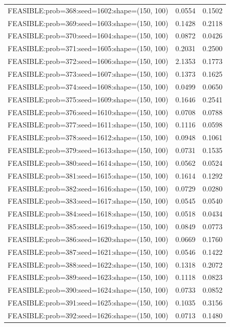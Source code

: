 \begin{longtable}{lcc}
FEASIBLE:prob=368:seed=1602:shape=(150, 100) &   0.0554 & 0.1502 \\
FEASIBLE:prob=369:seed=1603:shape=(150, 100) &   0.1428 & 0.2118 \\
FEASIBLE:prob=370:seed=1604:shape=(150, 100) &   0.0872 & 0.0426 \\
FEASIBLE:prob=371:seed=1605:shape=(150, 100) &   0.2031 & 0.2500 \\
FEASIBLE:prob=372:seed=1606:shape=(150, 100) &   2.1353 & 0.1773 \\
FEASIBLE:prob=373:seed=1607:shape=(150, 100) &   0.1373 & 0.1625 \\
FEASIBLE:prob=374:seed=1608:shape=(150, 100) &   0.0499 & 0.0650 \\
FEASIBLE:prob=375:seed=1609:shape=(150, 100) &   0.1646 & 0.2541 \\
FEASIBLE:prob=376:seed=1610:shape=(150, 100) &   0.0708 & 0.0788 \\
FEASIBLE:prob=377:seed=1611:shape=(150, 100) &   0.1116 & 0.0598 \\
FEASIBLE:prob=378:seed=1612:shape=(150, 100) &   0.0948 & 0.1061 \\
FEASIBLE:prob=379:seed=1613:shape=(150, 100) &   0.0731 & 0.1535 \\
FEASIBLE:prob=380:seed=1614:shape=(150, 100) &   0.0562 & 0.0524 \\
FEASIBLE:prob=381:seed=1615:shape=(150, 100) &   0.1614 & 0.1292 \\
FEASIBLE:prob=382:seed=1616:shape=(150, 100) &   0.0729 & 0.0280 \\
FEASIBLE:prob=383:seed=1617:shape=(150, 100) &   0.0545 & 0.0540 \\
FEASIBLE:prob=384:seed=1618:shape=(150, 100) &   0.0518 & 0.0434 \\
FEASIBLE:prob=385:seed=1619:shape=(150, 100) &   0.0849 & 0.0773 \\
FEASIBLE:prob=386:seed=1620:shape=(150, 100) &   0.0669 & 0.1760 \\
FEASIBLE:prob=387:seed=1621:shape=(150, 100) &   0.0546 & 0.1422 \\
FEASIBLE:prob=388:seed=1622:shape=(150, 100) &   0.1318 & 0.2072 \\
FEASIBLE:prob=389:seed=1623:shape=(150, 100) &   0.1118 & 0.0823 \\
FEASIBLE:prob=390:seed=1624:shape=(150, 100) &   0.0733 & 0.0852 \\
FEASIBLE:prob=391:seed=1625:shape=(150, 100) &   0.1035 & 0.3156 \\
FEASIBLE:prob=392:seed=1626:shape=(150, 100) &   0.0713 & 0.1480 \\

\end{longtable}
